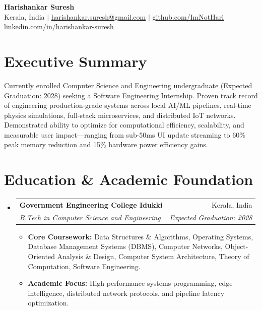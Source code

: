 \documentclass[letterpaper,10pt]{article}
\makeatletter
\newcommand{\resumeItem}[1]{\item\small{#1}\vspace{-1.5pt}}
\newcommand{\resumeSubheading}[4]{%
  \item
  \begin{tabular*}{\linewidth}[t]{@{}l@{\extracolsep{\fill}}r@{}}
    \textbf{#1} & \small #2 \\
    \textit{\small #3} & \textit{\small #4} \\
  \end{tabular*}\vspace{-3pt}
}
\newcommand{\resumeSubHeadingList}{\begin{itemize}[leftmargin=0.15in, label={}]}
\newcommand{\resumeSubHeadingListEnd}{\end{itemize}}
\newcommand{\resumeItemList}{\begin{itemize}[leftmargin=0.25in, itemsep=2pt]}
\newcommand{\resumeItemListEnd}{\end{itemize}\vspace{1pt}}
\makeatother
\begin{document}


\begin{center}
  {\Huge\textbf{Harishankar Suresh}} \\[4pt]
  \small Kerala, India
  \enspace$|$\enspace
  \href{mailto:harishankar.suresh@gmail.com}{harishankar.suresh@gmail.com}
  \enspace$|$\enspace
  \href{https://github.com/ImNotHari}{github.com/ImNotHari}
  \enspace$|$\enspace
  \href{https://www.linkedin.com/in/harishankar-suresh-2aa657201/}{linkedin.com/in/harishankar-suresh}
\end{center}
\vspace{-6pt}

\section{Executive Summary}
\begin{itemize}[leftmargin=0.15in, label={}]
  \small{\item{Currently enrolled Computer Science and Engineering undergraduate (Expected Graduation: 2028) seeking a Software Engineering Internship. Proven track record of engineering production-grade systems across local AI/ML pipelines, real-time physics simulations, full-stack microservices, and distributed IoT networks. Demonstrated ability to optimize for computational efficiency, scalability, and measurable user impact---ranging from sub-50ms UI update streaming to 60\% peak memory reduction and 15\% hardware power efficiency gains.}}
\end{itemize}
\vspace{-6pt}

\section{Education \& Academic Foundation}
\resumeSubHeadingList
  \resumeSubheading
    {Government Engineering College Idukki}{Kerala, India}
    {B.Tech in Computer Science and Engineering}{Expected Graduation: 2028}
  \resumeItemList
    \resumeItem{\textbf{Core Coursework:} Data Structures \& Algorithms, Operating Systems, Database Management Systems (DBMS), Computer Networks, Object-Oriented Analysis \& Design, Computer System Architecture, Theory of Computation, Software Engineering.}
    \resumeItem{\textbf{Academic Focus:} High-performance systems programming, edge intelligence, distributed network protocols, and pipeline latency optimization.}
  \resumeItemListEnd
\resumeSubHeadingListEnd
\end{document}
